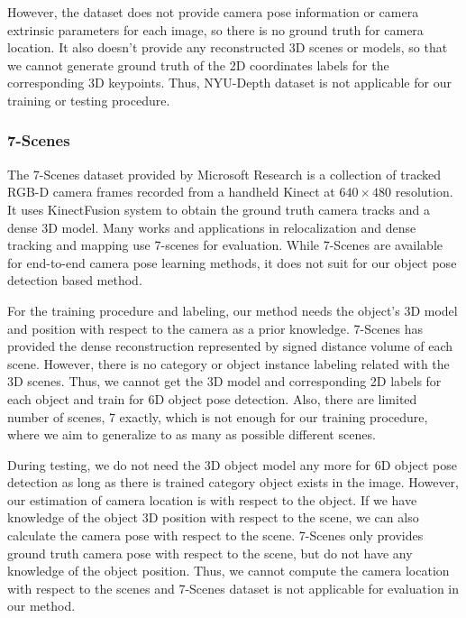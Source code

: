 However, the dataset does not provide camera pose information or camera extrinsic parameters for each image, so there is no ground truth for camera location. It also doesn't provide any reconstructed 3D scenes or models, so that we cannot generate ground truth of the 2D coordinates labels for the corresponding 3D keypoints. Thus, NYU-Depth dataset is not applicable for our training or testing procedure.

\subsubsection{7-Scenes}
The 7-Scenes dataset provided by Microsoft Research is a collection of tracked RGB-D camera frames recorded from a handheld Kinect at $640 \times 480$ resolution. It uses KinectFusion system to obtain the ground truth camera tracks and a dense 3D model. Many works and applications in relocalization \cite{shotton2013scene, glocker2013real, wu2017delving} and dense tracking and mapping use 7-scenes for evaluation. While 7-Scenes are available for end-to-end camera pose learning methods, it does not suit for our object pose detection based method.

For the training procedure and labeling, our method needs the object's 3D model and position with respect to the camera as a prior knowledge. 7-Scenes has provided the dense reconstruction represented by signed distance volume of each scene. However, there is no category or object instance labeling related with the 3D scenes. Thus, we cannot get the 3D model and corresponding 2D labels for each object and train for 6D object pose detection. Also, there are limited number of scenes, 7 exactly, which is not enough for our training procedure, where we aim to generalize to as many as possible different scenes. 

During testing, we do not need the 3D object model any more for 6D object pose detection as long as there is trained category object exists in the image. However, our estimation of camera location is with respect to the object. If we have knowledge of the object 3D position with respect to the scene, we can also calculate the camera pose with respect to the scene. 7-Scenes only provides ground truth camera pose with respect to the scene, but do not have any knowledge of the object position. Thus, we cannot compute the camera location with respect to the scenes and 7-Scenes dataset is not applicable for evaluation in our method.

